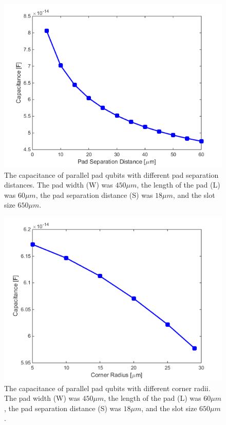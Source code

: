 \begin{figure}[h]
	\centering
	\includegraphics[scale = 0.7]{Figures/Capacitance_plots/IBMCapVSPadSep}
	\caption{The capacitance of parallel pad qubits with different pad separation distances. The pad width (W) was \(450 \mu m\), the length of the pad (L) was \(60 \mu m\), the pad separation distance (S) was \(18 \mu m\), and the slot size \(650 \mu m\).}
	\label{fig:IBMCapVSPadSep}
\end{figure}


\begin{figure}
	\centering
	\includegraphics[scale = 0.7]{Figures/Capacitance_plots/IBMCapVSCornerRadius}
	\caption{The capacitance of parallel pad qubits with different corner radii. The pad width (W) was \(450 \mu m\), the length of the pad (L) was \(60 \mu m\), the pad separation distance (S) was \(18 \mu m\), and the slot size \(650 \mu m\).}
	\label{fig:IBMCapVSCornerRadius}
\end{figure}

